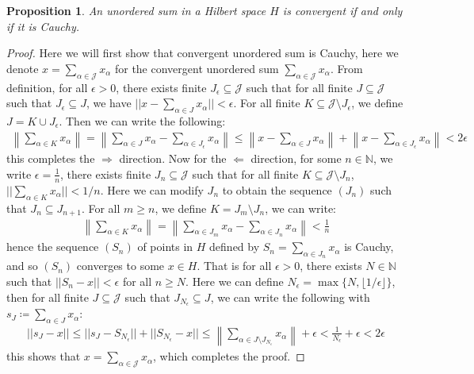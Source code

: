\documentclass[11pt]{book}
\theoremstyle{break}
\theoremstyle{break}
\newtheorem{prop}[lem]{Proposition}
\newcommand{\N}{\mathbb{N}}
\begin{document}
\begin{prop}
An unordered sum in a Hilbert space $H$ is convergent if and only if it is Cauchy.
\end{prop}
\begin{proof}
Here we will first show that convergent unordered sum is Cauchy, here we denote $x = \sum_{\alpha \in \mathcal{J}}x_{\alpha}$ for the convergent unordered sum $\sum_{\alpha \in \mathcal{J}}x_{\alpha}$. From definition, for all $\epsilon>0$, there exists finite $J_{\epsilon} \subseteq \mathcal{J}$ such that for all finite $J \subseteq \mathcal{J}$ such that $J_{\epsilon}\subseteq J$, we have $||x - \sum_{\alpha\in J} x_\alpha|| < \epsilon$. For all finite $K \subseteq \mathcal{J} \setminus J_{\epsilon}$, we define $J = K \cup J_{\epsilon}$.  Then we can write the following:
\begin{align*}
\left\| \sum_{\alpha \in K}x_\alpha \right\| = \left\| \sum_{\alpha \in J}x_\alpha - \sum_{\alpha \in J_{\epsilon}} x_\alpha \right\| \leq \left\| x - \sum_{\alpha \in J}x_\alpha \right\| + \left\| x - \sum_{\alpha \in J_{\epsilon}}x_\alpha \right\| < 2\epsilon
\end{align*}
this completes the $\Rightarrow$ direction. Now for the $\Leftarrow$ direction, for some $n \in \N$, we write $\epsilon = \frac{1}{n}$, there exists finite $J_n \subseteq \mathcal{J}$ such that for all finite $K \subseteq \mathcal{J} \setminus J_n$, $|| \sum_{\alpha \in K}x_\alpha || < 1/n$. Here we can modify $J_n$ to obtain the sequence $(J_n)$ such that $J_n \subseteq J_{n+1}$. For all $m \geq n$, we define $K = J_m \setminus J_n$, we can write:
\begin{align*}
\left\| \sum_{\alpha \in K}x_\alpha \right\| = \left\|\sum_{\alpha \in J_m} x_\alpha - \sum_{\alpha \in J_n}x_\alpha \right\| < \frac{1}{n}
\end{align*}
hence the sequence $(S_n)$ of points in $H$ defined by $S_n = \sum_{\alpha \in J_n}x_\alpha$ is Cauchy, and so $(S_n)$ converges to some $x \in H$. That is for all $\epsilon>0$, there exists $N \in \N$ such that $||S_n - x|| < \epsilon$ for all $n \geq N$. Here we can define $N_{\epsilon} = \max\{ N , \lfloor 1/\epsilon\rfloor\}$, then for all finite $J \subseteq \mathcal{J}$ such that $J_{N_{\epsilon}} \subseteq J$, we can write the following with $s_J \coloneqq \sum_{\alpha \in J}x_\alpha$:
\begin{align*}
||s_J - x|| \leq ||s_J - S_{N_{\epsilon}}|| + ||S_{N_{\epsilon}} - x|| \leq \left\|\sum_{\alpha \in J\setminus J_{N_{\epsilon}}} x_{\alpha}\right\| + \epsilon< \frac{1}{N_{\epsilon}} + \epsilon < 2\epsilon 
\end{align*} 
this shows that $x = \sum_{\alpha \in \mathcal{J}}x_{\alpha}$, which completes the proof. 
\end{proof}
\end{document}
